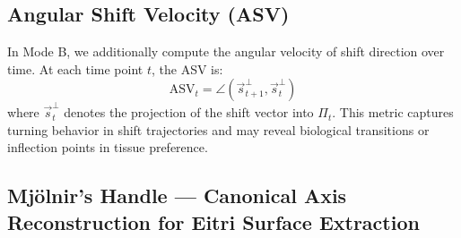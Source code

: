     \subsection{Angular Shift Velocity (ASV)}

        In Mode B, we additionally compute the angular velocity of shift direction over time. At each time point \( t \), the ASV is:
        \[
            \text{ASV}_t = \angle\left( \vec{s}_{t+1}^{\perp}, \vec{s}_t^{\perp} \right)
        \]
        where \( \vec{s}_t^{\perp} \) denotes the projection of the shift vector into \( \Pi_t \). This metric captures turning behavior in shift trajectories and may reveal biological transitions or inflection points in tissue preference.

    \subsection{Mjölnir's Handle — Canonical Axis Reconstruction for Eitri Surface Extraction}\label{sec:semantic_axis}

